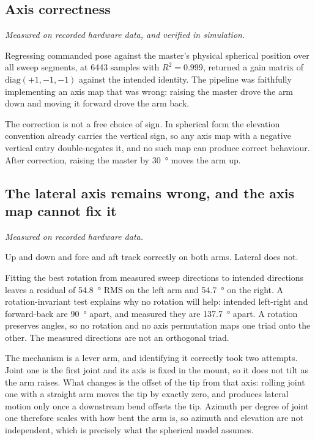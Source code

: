 \subsection{Axis correctness}

\emph{Measured on recorded hardware data, and verified in simulation.}

Regressing commanded pose against the master's physical spherical position
over all sweep segments, at \num{6443} samples with $R^2 = \num{0.999}$,
returned a gain matrix of $\mathrm{diag}(+1, -1, -1)$ against the intended
identity. The pipeline was faithfully implementing an axis map that was wrong:
raising the master drove the arm down and moving it forward drove the arm
back.

The correction is not a free choice of sign. In spherical form the elevation
convention already carries the vertical sign, so any axis map with a negative
vertical entry double-negates it, and no such map can produce correct
behaviour. After correction, raising the master by \SI{30}{\degree} moves the
arm up.

\subsection{The lateral axis remains wrong, and the axis map cannot fix it}

\emph{Measured on recorded hardware data.}

Up and down and fore and aft track correctly on both arms. Lateral does not.

Fitting the best rotation from measured sweep directions to intended
directions leaves a residual of \SI{54.8}{\degree} RMS on the left arm and
\SI{54.7}{\degree} on the right. A rotation-invariant test explains why no
rotation will help: intended left-right and forward-back are
\SI{90}{\degree} apart, and measured they are \SI{137.7}{\degree} apart. A
rotation preserves angles, so no rotation and no axis permutation maps one
triad onto the other. The measured directions are not an orthogonal triad.

The mechanism is a lever arm, and identifying it correctly took two attempts.
Joint one is the first joint and its axis is fixed in the mount, so it does
not tilt as the arm raises. What changes is the offset of the tip from that
axis: rolling joint one with a straight arm moves the tip by exactly zero, and
produces lateral motion only once a downstream bend offsets the tip. Azimuth
per degree of joint one therefore scales with how bent the arm is, so azimuth
and elevation are not independent, which is precisely what the spherical model
assumes.

